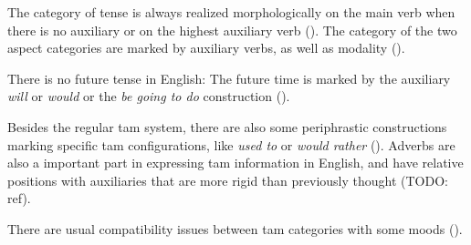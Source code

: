 \documentclass[UTF8, a4paper, oneside, scheme=plain]{ctexrep}
\newcommand{\corpus}[1]{\emph{#1}}
\begin{document}
The category of tense is always realized morphologically 
on the main verb when there is no auxiliary 
or on the highest auxiliary verb ().
The category of the two aspect categories are marked by auxiliary verbs, 
as well as modality (). 

There is no future tense in English:
The future time is marked by the auxiliary \corpus{will} or \corpus{would} 
or the \corpus{be going to do} construction ().

Besides the regular \acs{tam} system,
there are also some periphrastic constructions marking specific \acs{tam} configurations,
like \corpus{used to} or \corpus{would rather} ().
Adverbs are also a important part in expressing \acs{tam} information in English,
and have relative positions with auxiliaries that are more rigid than previously thought (TODO: ref).

There are usual compatibility issues between \acs{tam} categories 
with some moods ().
\end{document}
